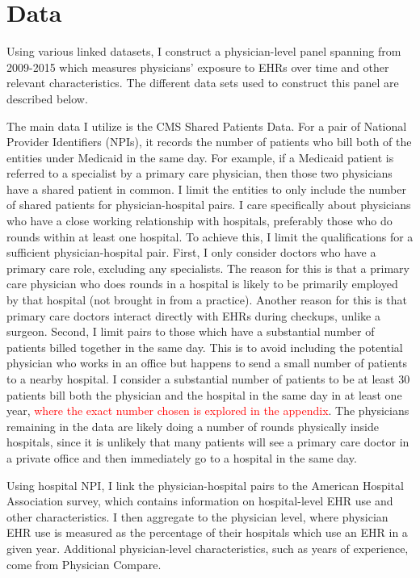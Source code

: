 \documentclass[11pt]{article}
\begin{document}
\section{Data}

Using various linked datasets, I construct a physician-level panel spanning from 2009-2015 which measures physicians' exposure to EHRs over time and other relevant characteristics. The different data sets used to construct this panel are described below.

The main data I utilize is the CMS Shared Patients Data. For a pair of National Provider Identifiers (NPIs), it records the number of patients who bill both of the entities under Medicaid in the same day. For example, if a Medicaid patient is referred to a specialist by a primary care physician, then those two physicians have a shared patient in common. I limit the entities to only include the number of shared patients for physician-hospital pairs. I care specifically about physicians who have a close working relationship with hospitals, preferably those who do rounds within at least one hospital. To achieve this, I limit the qualifications for a sufficient physician-hospital pair. First, I only consider doctors who have a primary care role, excluding any specialists. The reason for this is that a primary care physician who does rounds in a hospital is likely to be primarily employed by that hospital (not brought in from a practice). Another reason for this is that primary care doctors interact directly with EHRs during checkups, unlike a surgeon. Second, I limit pairs to those which have a substantial number of patients billed together in the same day. This is to avoid including the potential physician who works in an office but happens to send a small number of patients to a nearby hospital. I consider a substantial number of patients to be at least 30 patients bill both the physician and the hospital in the same day in at least one year, \textcolor{red}{where the exact number chosen is explored in the appendix}. The physicians remaining in the data are likely doing a number of rounds physically inside hospitals, since it is unlikely that many patients will see a primary care doctor in a private office and then immediately go to a hospital in the same day. 

Using hospital NPI, I link the physician-hospital pairs to the American Hospital Association survey, which contains information on hospital-level EHR use and other characteristics. I then aggregate to the physician level, where physician EHR use is measured as the percentage of their hospitals which use an EHR in a given year. Additional physician-level characteristics, such as years of experience, come from Physician Compare. 
\end{document}

